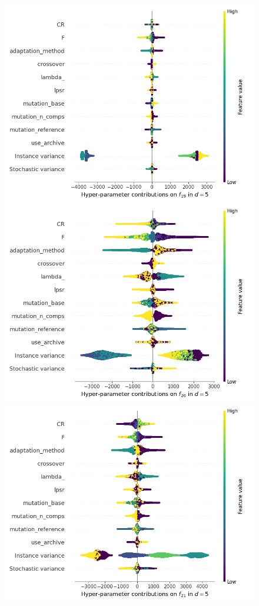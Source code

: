 \begin{figure}[t]
	\includegraphics[height=0.15\textheight,trim=60mm 0mm 30mm 0mm,clip]{de_img_new/img_summary_f19_d5.png}
	\includegraphics[height=0.15\textheight,trim=60mm 0mm 0mm 0mm,clip]{de_img_new/img_summary_f20_d5.png}
	\includegraphics[height=0.15\textheight,trim=0mm 0mm 30mm 0mm,clip]{de_img_new/img_summary_f21_d5.png}

\end{figure}
